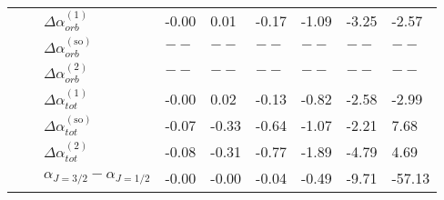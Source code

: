 \begin{longtable}{lllllllll}
      &         & $\Delta \alpha_{orb}^{(\text{1})}$ &        -0.00 &        0.01 &     -0.17 &     -1.09 &     -3.25 &        -2.57 \\
      &         & $\Delta \alpha_{orb}^{(\text{so})}$ &          $--$ &         $--$ &       $--$ &       $--$ &       $--$ &          $--$ \\
      &         & $\Delta \alpha_{orb}^{(\text{2})}$ &          $--$ &         $--$ &       $--$ &       $--$ &       $--$ &          $--$ \\
      &         & $\Delta \alpha_{tot}^{(\text{1})}$ &        -0.00 &        0.02 &     -0.13 &     -0.82 &     -2.58 &        -2.99 \\
      &         & $\Delta \alpha_{tot}^{(\text{so})}$ &        -0.07 &       -0.33 &     -0.64 &     -1.07 &     -2.21 &         7.68 \\
      &         & $\Delta \alpha_{tot}^{(\text{2})}$ &        -0.08 &       -0.31 &     -0.77 &     -1.89 &     -4.79 &         4.69 \\
      &         & $\alpha_{J=3/2}-\alpha_{J=1/2}$ &        -0.00 &       -0.00 &     -0.04 &     -0.49 &     -9.71 &       -57.13 \\
\end{longtable}
